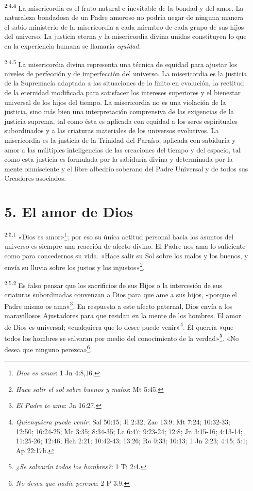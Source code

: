 \par
\textsuperscript{2:4.4} La misericordia es el fruto natural e inevitable de la bondad y del amor. La naturaleza bondadosa de un Padre amoroso no podría negar de ninguna manera el sabio ministerio de la misericordia a cada miembro de cada grupo de sus hijos del universo. La justicia eterna y la misericordia divina unidas constituyen lo que en la experiencia humana se llamaría \textit{equidad.}

\par
\textsuperscript{2:4.5} La misericordia divina representa una técnica de equidad para ajustar los niveles de perfección y de imperfección del universo. La misericordia es la justicia de la Supremacía adaptada a las situaciones de lo finito en evolución, la rectitud de la eternidad modificada para satisfacer los intereses superiores y el bienestar universal de los hijos del tiempo. La misericordia no es una violación de la justicia, sino más bien una interpretación comprensiva de las exigencias de la justicia suprema, tal como ésta es aplicada con equidad a los seres espirituales subordinados y a las criaturas materiales de los universos evolutivos. La misericordia es la justicia de la Trinidad del Paraíso, aplicada con sabiduría y amor a las múltiples inteligencias de las creaciones del tiempo y del espacio, tal como esta justicia es formulada por la sabiduría divina y determinada por la mente omnisciente y el libre albedrío soberano del Padre Universal y de todos sus Creadores asociados.

\section*{5. El amor de Dios}
\par
\textsuperscript{2:5.1} «Dios es amor»\footnote{\textit{Dios es amor}: 1 Jn 4:8,16.}; por eso su única actitud personal hacia los asuntos del universo es siempre una reacción de afecto divino. El Padre nos ama lo suficiente como para concedernos su vida. «Hace salir su Sol sobre los malos y los buenos, y envía su lluvia sobre los justos y los injustos»\footnote{\textit{Hace salir el sol sobre buenos y malos}: Mt 5:45.}.

\par
\textsuperscript{2:5.2} Es falso pensar que los sacrificios de sus Hijos o la intercesión de sus criaturas subordinadas convenzan a Dios para que ame a sus hijos, «porque el Padre mismo os ama»\footnote{\textit{El Padre te ama}: Jn 16:27.}. En respuesta a este afecto paternal, Dios envía a los maravillosos Ajustadores para que residan en la mente de los hombres. El amor de Dios es universal; «cualquiera que lo desee puede venir»\footnote{\textit{Quienquiera puede venir}: Sal 50:15; Jl 2:32; Zac 13:9; Mt 7:24; 10:32-33; 12:50; 16:24-25; Mc 3:35; 8:34-35; Lc 6:47; 9:23-24; 12:8; Jn 3:15-16; 4:13-14; 11:25-26; 12:46; Hch 2:21; 10:42-43; 13:26; Ro 9:33; 10:13; 1 Jn 2:23; 4:15; 5:1; Ap 22:17b.}. Él querría «que todos los hombres se salvaran por medio del conocimiento de la verdad»\footnote{\textit{¿Se salvarán todos los hombres?}: 1 Ti 2:4.}. «No desea que ninguno perezca»\footnote{\textit{No desea que nadie perezca}: 2 P 3:9.}.


